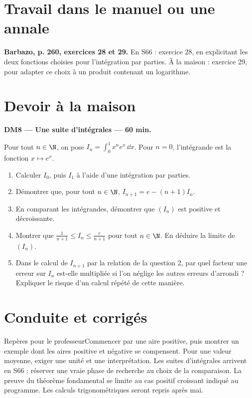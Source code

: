 \section{Travail dans le manuel ou une annale}\textbf{Barbazo, p. 260, exercices 28 et 29.} En S66 : exercice 28, en explicitant les deux fonctions choisies pour l'intégration par parties. À la maison : exercice 29, pour adapter ce choix à un produit contenant un logarithme.

\section{Devoir à la maison}\textbf{DM8 --- Une suite d'intégrales --- 60 min.}\par Pour tout $n\in\N$, on pose $I_n=\displaystyle\int_0^1x^ne^x\,\dd x$. Pour $n=0$, l'intégrande est la fonction $x\mapsto e^x$.
\begin{enumerate}\item Calculer $I_0$, puis $I_1$ à l'aide d'une intégration par parties.
\item Démontrer que, pour tout $n\in\N$, $I_{n+1}=e-(n+1)I_n$.
\item En comparant les intégrandes, démontrer que $(I_n)$ est positive et décroissante.
\item Montrer que $\frac1{n+1}\le I_n\le\frac e{n+1}$ pour tout $n\in\N$. En déduire la limite de $(I_n)$.
\item Dans le calcul de $I_{n+1}$ par la relation de la question 2, par quel facteur une erreur sur $I_n$ est-elle multipliée si l'on néglige les autres erreurs d'arrondi ? Expliquer le risque d'un calcul répété de cette manière.\end{enumerate}

\ifprof\clearpage\section{Conduite et corrigés}\begin{profbox}{Repères pour le professeur}Commencer par une aire positive, puis montrer un exemple dont les aires positive et négative se compensent. Pour une valeur moyenne, exiger une unité et une interprétation. Les suites d'intégrales arrivent en S66 ; réserver une vraie phase de recherche au choix de la comparaison. La preuve du théorème fondamental se limite au cas positif croissant indiqué au programme. Les calculs trigonométriques seront repris après mai.\end{profbox}

